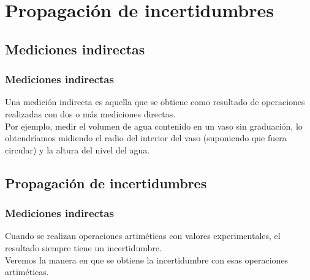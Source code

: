 \section{Propagación de incertidumbres}
\subsection{Mediciones indirectas}
\begin{frame}
\frametitle{Mediciones indirectas}
Una medición indirecta es aquella que se obtiene como resultado de operaciones realizadas con dos o más mediciones directas.
\\
\bigskip
\pause
Por ejemplo, medir el volumen de agua contenido en un vaso sin graduación, lo obtendríamos midiendo el radio del interior del vaso (suponiendo que fuera circular) y la altura del nivel del agua.
\end{frame}
\subsection{Propagación de incertidumbres}
\begin{frame}
\frametitle{Mediciones indirectas}
Cuando se realizan operaciones artiméticas con valores experimentales, el resultado siempre tiene un incertidumbre.
\\
\bigskip
\pause
Veremos la manera en que se obtiene la incertidumbre con  esas operaciones artiméticas.
\end{frame}
